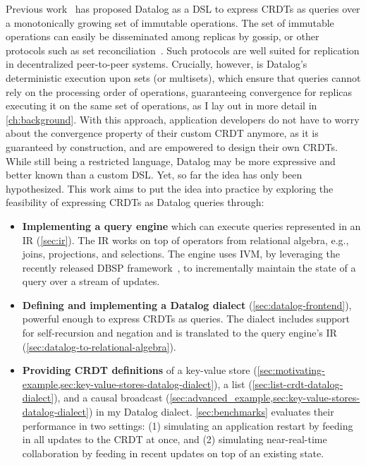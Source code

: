 Previous work~\cite{kleppmann2018data} has proposed Datalog as a \ac{DSL}
to express \acp{CRDT} as queries over a monotonically growing set of
immutable operations.
The set of immutable operations can easily be disseminated among replicas
by gossip, or other protocols such as set
reconciliation~\cite{ratelesssetreconc,rangebasedsetreconc}.
Such protocols are well suited for replication in decentralized peer-to-peer systems.
Crucially, however, is  Datalog's deterministic execution upon sets (or multisets),
which ensure that queries cannot rely on the processing order of operations,
guaranteeing convergence for replicas executing it on the same set of operations,
as I lay out in more detail in \autoref{ch:background}.
With this approach, application developers do not have to worry about
the convergence property of their custom \ac{CRDT} anymore,
as it is guaranteed by construction, and are empowered to design their own \acp{CRDT}.
While still being a restricted language, Datalog may be more expressive
and better known than a custom \ac{DSL}.
Yet, so far the idea has only been hypothesized.
This work aims to put the idea into practice by exploring the feasibility of
expressing \acp{CRDT} as Datalog queries through:

\begin{itemize}
    \item \textbf{Implementing a query engine} which can execute queries
          represented in an \acl{IR} (\ref{sec:ir}).
          The \acl{IR} works on top of operators from relational algebra, e.g.,
          joins, projections, and selections.
          The engine uses \acl{IVM}, by leveraging the recently released DBSP
          framework~\cite{budiu2025dbsp}, to incrementally maintain the state
          of a query over a stream of updates.
    \item \textbf{Defining and implementing a Datalog dialect} (\ref{sec:datalog-frontend}),
          powerful enough to express \acp{CRDT} as queries.
          The dialect includes support for self-recursion and negation and is translated
          to the query engine's \acl{IR} (\ref{sec:datalog-to-relational-algebra}).
    \item \textbf{Providing \ac{CRDT} definitions} of a key-value store
          (\ref{sec:motivating-example,sec:key-value-stores-datalog-dialect}),
          a list (\ref{sec:list-crdt-datalog-dialect}), and a causal broadcast
          (\ref{sec:advanced_example,sec:key-value-stores-datalog-dialect})
          in my Datalog dialect.
          \ref{sec:benchmarks} evaluates their performance in two settings:
          (1) simulating an application restart by feeding in all updates to
          the \ac{CRDT} at once, and (2) simulating near-real-time collaboration
          by feeding in recent updates on top of an existing state.
\end{itemize}

